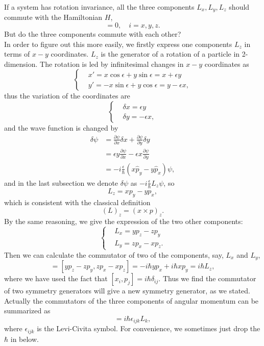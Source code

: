\documentclass{article}
\newcommand{\be}{\begin{equation}}
\newcommand{\ee}{\end{equation}}
\newcommand{\p}{\partial}
\renewcommand{\1}{\left}
\renewcommand{\2}{\right}
\newcommand{\ep}{\epsilon}
\newcommand{\del}{\delta}
\begin{document}
If a system has rotation invariance, all the three components $L_x, L_y, L_z$ should commute with the Hamiltonian $H$,
\be
[L_i, H]=0, \quad i=x,y,z.
\ee
But do the three components commute with each other? \\
In order to figure out this more easily, we firstly express one components $L_z$ in terms of $x-y$ coordinates. $L_z$ is the generator of a rotation of a particle in 2-dimension. The rotation is led by infinitesimal changes in $x-y$ coordinates as
\be\1\{\begin{split}
&x'=x\cos{\ep}+y\sin{\ep}=x+\ep y \\
&y'=-x\sin\ep +y\cos\ep=y-\ep x,
\end{split}\2.\ee
thus the variation of the coordinates are
\be\1\{\begin{split}
&\del x=\ep y \\
&\del y=-\ep x,
\end{split}\2.\ee
and the wave function is changed by
\be\begin{split}
\del \psi&=\frac{\p\psi}{\p x}\del x+\frac{\p\psi}{\p y}\del y\\
&=\ep y\frac{\p\psi}{\p x}-\ep x\frac{\p\psi}{\p y}\\
&=-i\frac{\ep}{\hbar}(x \hat p_y-y \hat p_x)\psi,
\end{split}\ee
and in the last subsection we denote $\del\psi$ as $-i\frac{\ep}{\hbar}L_z\psi$, so 
\be
L_z=xp_y-yp_x,
\ee
which is consistent with the classical definition
\be
(L)_z=(x\times p)_z.
\ee
By the same reasoning, we give the expression of the two other components:
\be\1\{\begin{split}
&L_x=yp_z-zp_y \\
&L_y=zp_x-xp_z.
\end{split}\2.\ee
Then we can calculate the commutator of two of the components, say, $L_x$ and $L_y$,
\be
[L_x,L_y]=[yp_z-zp_y,zp_x-xp_z]=-i\hbar yp_x+i\hbar xp_y=i\hbar L_z,
\ee
where we have used the fact that $[x_i,p_j]=i\hbar \del_{ij}$. Thus we find the commutator of two symmetry generators will give a new symmetry generator, as we stated. Actually the commutators of the three components of angular momentum can be summarized as 
\be
[L_i,L_j]=i\hbar \ep_{ijk}L_k,
\ee
where $\ep_{ijk}$ is the Levi-Civita symbol. For convenience, we sometimes just drop the $\hbar$ in below.
\end{document}
